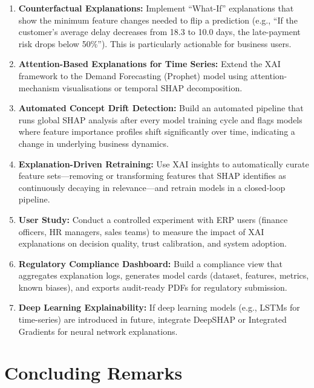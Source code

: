 \documentclass[12pt,a4paper]{report}
\begin{document}
\begin{enumerate}[label=\arabic*.]
  \item \textbf{Counterfactual Explanations:} Implement ``What-If'' explanations that show the minimum feature changes needed to flip a prediction (e.g., ``If the customer's average delay decreases from 18.3 to 10.0 days, the late-payment risk drops below 50\%''). This is particularly actionable for business users.

  \item \textbf{Attention-Based Explanations for Time Series:} Extend the XAI framework to the Demand Forecasting (Prophet) model using attention-mechanism visualisations or temporal SHAP decomposition.

  \item \textbf{Automated Concept Drift Detection:} Build an automated pipeline that runs global SHAP analysis after every model training cycle and flags models where feature importance profiles shift significantly over time, indicating a change in underlying business dynamics.

  \item \textbf{Explanation-Driven Retraining:} Use XAI insights to automatically curate feature sets---removing or transforming features that SHAP identifies as continuously decaying in relevance---and retrain models in a closed-loop pipeline.

  \item \textbf{User Study:} Conduct a controlled experiment with ERP users (finance officers, HR managers, sales teams) to measure the impact of XAI explanations on decision quality, trust calibration, and system adoption.

  \item \textbf{Regulatory Compliance Dashboard:} Build a compliance view that aggregates explanation logs, generates model cards (dataset, features, metrics, known biases), and exports audit-ready PDFs for regulatory submission.

  \item \textbf{Deep Learning Explainability:} If deep learning models (e.g., LSTMs for time-series) are introduced in future, integrate DeepSHAP or Integrated Gradients for neural network explanations.
\end{enumerate}

\section{Concluding Remarks}
\label{sec:concluding}
\end{document}

